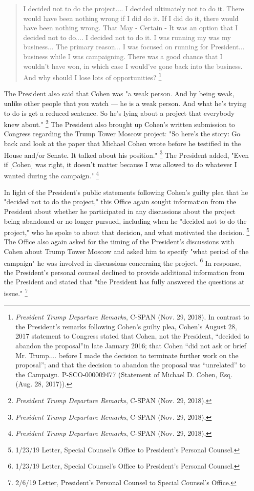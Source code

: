 \begin{quote}
I decided not to do the project....
I decided ultimately not to do it.
There would have been nothing wrong if I did do it.
If I did do it, there would have been nothing wrong.
That
May - Certain -
It was an option that I decided not to do....
I decided not to do it.
I was running my
was my business...
The primary reason...
I was focused on running for President...
business while I was campaigning.
There was a good chance that I wouldn't have won, in which case I would've gone back into the business.
And why should I lose lots of opportunities?%
\footnote{\textit{President Trump Departure Remarks}, C-SPAN (Nov. 29, 2018).
In contrast to the President’s remarks following Cohen’s guilty plea, Cohen’s August 28, 2017 statement to Congress stated that Cohen, not the President, “decided to abandon the proposal”in late January 2016;
that Cohen “did not ask or brief Mr. Trump.... before I made the decision to terminate further work on the proposal”;
and that the decision to abandon the proposal was “unrelated” to the Campaign. P-SCO-000009477 (Statement of Michael D. Cohen, Esq. (Aug. 28, 2017)).
}
\end{quote}

The President also said that Cohen was "a weak person.
And by being weak, unlike other people that you watch — he is a weak person.
And what he's trying to do is get a reduced sentence.
So he's lying about a project that everybody knew about."%
\footnote{\textit{President Trump Departure Remarks}, C-SPAN (Nov. 29, 2018).}
The President also brought up Cohen's written submission to Congress regarding the Trump Tower Moscow project:
"So here's the story: Go back and look at the paper that Michael Cohen wrote before he testified in the House and/or Senate.
It talked about his position."%
\footnote{\textit{President Trump Departure Remarks}, C-SPAN (Nov. 29, 2018).}
The President added, "Even if [Cohen] was right, it doesn't matter because I was allowed to do whatever I wanted during the campaign."%
\footnote{\textit{President Trump Departure Remarks}, C-SPAN (Nov. 29, 2018).}

In light of the President's public statements following Cohen's guilty plea that he "decided not to do the project," this Office again sought information from the President about whether he participated in any discussions about the project being abandoned or no longer pursued, including when he "decided not to do the project," who he spoke to about that decision, and what motivated the decision.%
\footnote{1/23/19 Letter, Special Counsel’s Office to President’s Personal Counsel.}
The Office also again asked for the timing of the President's discussions with Cohen about Trump Tower Moscow and asked him to specify "what period of the campaign" he was involved in discussions concerning the project.%
\footnote{1/23/19 Letter, Special Counsel’s Office to President’s Personal Counsel.}
In response, the President's personal counsel declined to provide additional information from the President and stated that "the President has fully answered the questions at issue."%
\footnote{2/6/19 Letter, President’s Personal Counsel to Special Counsel’s Office.}

